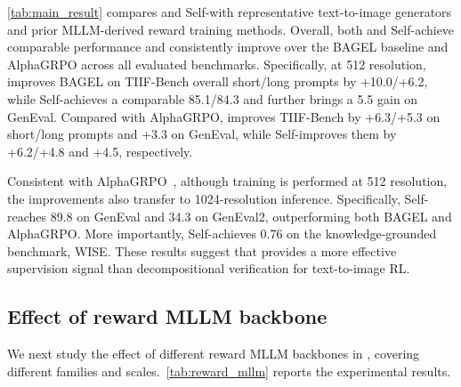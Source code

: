 \autoref{tab:main_result} compares \method and
Self-\method with representative text-to-image generators and prior
MLLM-derived reward training methods. Overall, both \method and
Self-\method achieve comparable
performance and consistently improve over the BAGEL baseline and AlphaGRPO
across all evaluated benchmarks. 
Specifically, at 512 resolution, \method improves BAGEL on TIIF-Bench overall
short/long prompts by +10.0/+6.2, while
Self-\method achieves a comparable 85.1/84.3 and further brings a 5.5 gain on GenEval. 
Compared with AlphaGRPO, \method improves
TIIF-Bench by +6.3/+5.3 on short/long prompts and +3.3 on GenEval, while
Self-\method improves them by +6.2/+4.8 and +4.5, respectively.

Consistent with AlphaGRPO~\cite{alphagrpo}, although training is performed at 512 resolution, 
the improvements also transfer to 1024-resolution inference. 
Specifically, Self-\method reaches 89.8 on GenEval and 34.3 on GenEval2, outperforming both BAGEL and
AlphaGRPO. More importantly, Self-\method achieves 0.76 on the knowledge-grounded benchmark, WISE.
These results suggest that \method provides a more effective supervision signal than
decompositional verification for text-to-image RL.



\subsection{Effect of reward MLLM backbone}
\label{sec:reward_backbone}
We next study the effect of different reward MLLM backbones in \method, covering different families and scales.~\autoref{tab:reward_mllm} reports the experimental results.


